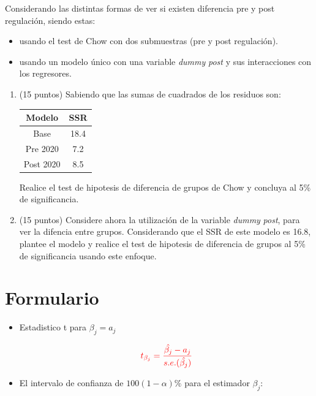 \documentclass[10pt,a4paper]{article}
\begin{document}
\begin{enumerate}
Considerando las distintas formas de ver si existen diferencia pre y post regulación, siendo estas:
    \begin{itemize}
        \item usando el test de Chow con dos submuestras (pre y post regulación).
        \item usando un modelo único con una variable \textit{dummy} \textit{post} y sus interacciones con los regresores.
    \end{itemize}

\begin{enumerate}    
    \item[(a)] (15 puntos) Sabiendo que las sumas de cuadrados de los residuos son:
    \begin{table}[H]
        \centering
        \begin{tabular}{|c|c|}
            \hline
            Modelo & SSR \\
            \hline
            Base &  18.4 \\
            Pre 2020 & 7.2 \\
            Post 2020 & 8.5 \\
            \hline
        \end{tabular}
        \label{tab:placeholder}
    \end{table}

    Realice el test de hipotesis de diferencia de grupos de Chow y concluya al 5\% de significancia.
    
    \item[(b)] (15 puntos) Considere ahora la utilización de la variable \textit{dummy} \textit{post}, para ver la difencia entre grupos. Considerando que el SSR de este modelo es 16.8, plantee el modelo y realice el test de hipotesis de diferencia de grupos al 5\% de significancia usando este enfoque. 

    
\end{enumerate}


\newpage
\section*{Formulario}
\begin{itemize}

\item Estadistico t para $\beta_j = a_j$

$$\color{red}{t_{\beta_j}=\frac{\hat{\beta_j}-a_j}{s.e.(\hat{\beta_j})}}$$

\item El intervalo de confianza de $100(1-\alpha)\%$ para el estimador $\beta_j$:


\end{itemize}
\end{enumerate}
\end{document}
